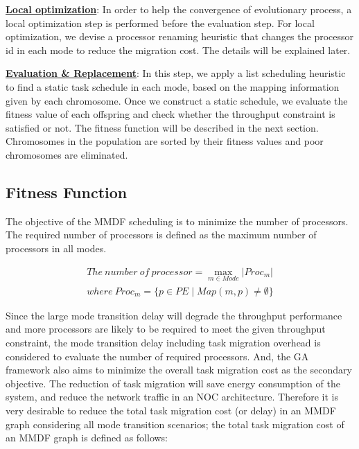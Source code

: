 \documentclass[prodmode,acmtecs]{acmsmall}
\begin{document}
\vspace{0.2cm}

\textbf{\underline{Local optimization}}: In order to help the convergence of evolutionary process, a local optimization step is performed before the evaluation step. For local optimization, we devise a processor renaming heuristic that changes the processor id in each mode to reduce the migration cost. The details will be explained later.

\vspace{0.2cm}

\textbf{\underline{Evaluation \& Replacement}}: In this step, we apply a list scheduling heuristic to find a static task schedule in each mode, based on the mapping information given by each chromosome. Once we construct a static schedule, we evaluate the fitness value of each offspring and check whether the throughput constraint is satisfied or not. The fitness function will be described in the next section. Chromosomes in the population are sorted by their fitness values and poor chromosomes are eliminated.

\subsection{Fitness Function}
\label{SubSection:Fitness Function}

The objective of the MMDF scheduling is to minimize the number of processors. The required number of processors is defined as the maximum number of processors in all modes.

\begin{definition}
\label{Definition:The number of processors for an MMDF graph}
\begin{gather*}
The \: number \: of \: processor = \max_{m \in Mode} |Proc_m| \\
where \: Proc_m = \lbrace p \in PE \mid Map(m, p) \neq \emptyset \rbrace
\end{gather*}
\end{definition}

Since the large mode transition delay will degrade the throughput performance and more processors are likely to be required to meet the given throughput constraint, the mode transition delay including task migration overhead is considered to evaluate the number of required processors. And, the GA framework also aims to minimize the overall task migration cost as the secondary objective. The reduction of task migration will save energy consumption of the system, and reduce the network traffic in an NOC architecture. Therefore it is very desirable to reduce the total task migration cost (or delay) in an MMDF graph considering all mode transition scenarios; the total task migration cost of an MMDF graph is defined as follows:
\end{document}
